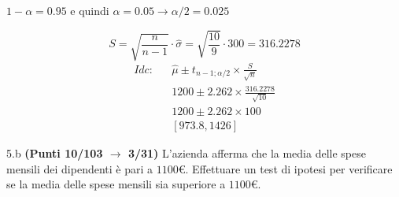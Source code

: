 \documentclass[
  11pt,
]{book}
\theoremstyle{mytheoremstyle}
\theoremstyle{mydefstyle}
\newenvironment{sol}
  {
  \begin{tcolorbox}[enhanced,breakable,arc=0.1mm,boxrule=1pt,colback=white,colframe=iblue,
  title=\bf \fontfamily{lmss}\selectfont \hspace{.5 cm} Soluzione,drop fuzzy shadow]

}{
\end{tcolorbox}
  }
\begin{document}
\begin{sol}
\(1-\alpha =0.95\) e quindi \(\alpha=0.05\rightarrow \alpha/2=0.025\)

\[
      S  =\sqrt{\frac {n}{n-1}}\cdot\hat\sigma =
     \sqrt{\frac { 10 }{ 9 }}\cdot 300 = 316.2278 
\]
\begin{eqnarray*}
  Idc: & &  \hat\mu \pm  t_{n-1;\alpha/2} \times \frac{S}{\sqrt{n}} \\
     & &  1200 \pm  2.262 \times \frac{ 316.2278 }{\sqrt{ 10 }} \\
     & &  1200 \pm  2.262 \times  100 \\
     & & [ 973.8 ,  1426 ]
\end{eqnarray*}

\end{sol}

5.b \textbf{(Punti 10/103 \(\rightarrow\) 3/31)} L'azienda afferma che la media delle spese mensili dei dipendenti è pari a \(1100€\). Effettuare un test di ipotesi per verificare se la media delle spese mensili sia superiore a \(1100€\).
\end{document}
